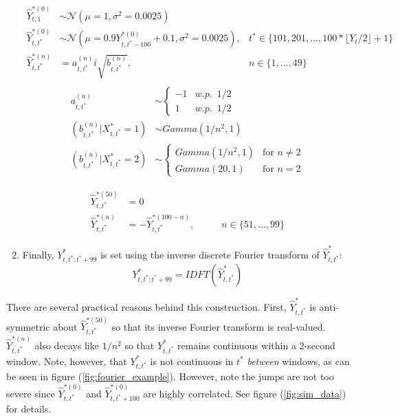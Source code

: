 \begin{enumerate}
	\begin{align*}
    	\hat{Y}^{*(0)}_{t,1} &\sim \mathcal{N} \left(\mu = 1, \sigma^2 = 0.0025 \right) & \\
    	\hat{Y}^{*(0)}_{t,t^*} &\sim \mathcal{N} \left(\mu = 0.9 Y^{*(0)}_{t,t^*-100} + 0.1, \sigma^2 = 0.0025 \right), & t^* \in \{101,201,\ldots, 100*\lfloor Y_t/2 \rfloor + 1\} \\
    	\hat{Y}^{*(n)}_{t,t^*} &= a_{t,t^*}^{(n)} i\sqrt{b^{(n)}_{t,t^*}}, & n \in \{1,\ldots,49\} \\
	\end{align*}
	\begin{align*}
	    a_{t,t^*}^{(n)} &\sim  \left\{\begin{array}{lr}
    	-1 & w.p. \enspace 1/2 \\
    	1  & w.p. \enspace 1/2
    	\end{array}\right. \\
    	(b^{(n)}_{t,t^*}|X^*_{t,t^*}  = 1) &\sim Gamma(1/n^2, 1) \\
    	(b^{(n)}_{t,t^*}|X^*_{t,t^*} = 2) &\sim \left\{\begin{array}{lr}
    	Gamma(1/n^2, 1) & \text{for } n \neq 2\\
    	Gamma(20,1) & \text{for } n = 2
    	\end{array}\right. 
	\end{align*}

    \begin{align*}
        \hat{Y}^{*(50)}_{t,t^*} &= 0 & \\
    	\hat{Y}^{*(n)}_{t,t^*}  &= -\hat{Y}^{*(100-n)}_{t,t^*}, & \qquad n \in \{51,\ldots,99\}
    \end{align*}
	
	\item Finally, $Y^*_{t,t^*:t^*+99}$ is set using the inverse discrete Fourier transform of $\hat{Y}^*_{t,t^*}$:
	$$Y^*_{t,t^*:t^*+99} = IDFT\left(\hat{Y}^*_{t,t^*}\right)$$
		
\end{enumerate}

There are several practical reasons behind this construction. First, $\hat{Y}^*_{t,t^*}$ is anti-symmetric about $\hat{Y}^{*(50)}_{t,t^*}$ so that its inverse Fourier transform is real-valued. $\hat{Y}^{*(n)}_{t,t^*}$ also decays like $1/n^2$ so that $Y^*_{t,t^*}$ remains continuous within a 2-second window. Note, however, that $Y^*_{t,t^*}$ is not continuous in $t^*$ \textit{between} windows, as can be seen in figure (\ref{fig:fourier_example}). However, note the jumps are not too severe since $\hat{Y}^{*(0)}_{t,t^*}$ and $\hat{Y}^{*(0)}_{t,t^*+100}$ are highly correlated. See figure (\ref{fig:sim_data}) for details.

